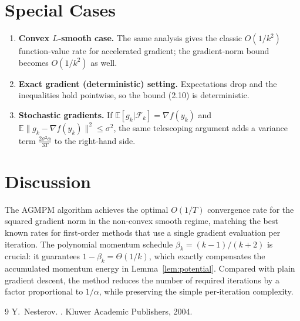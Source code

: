 \documentclass{article}
\newcommand{\E}{\mathbb{E}}
\begin{document}
\section*{Special Cases}
\begin{enumerate}[nosep]
    \item \textbf{Convex $L$‑smooth case.}
          The same analysis gives the classic $O(1/k^2)$ function‑value rate
          for accelerated gradient; the gradient‑norm bound becomes
          $O(1/k^2)$ as well.
    \item \textbf{Exact gradient (deterministic) setting.}
          Expectations drop and the inequalities hold pointwise, so the
          bound (2.10) is deterministic.
    \item \textbf{Stochastic gradients.}
          If $\E[g_k|\mathcal{F}_k]=\nabla f(y_k)$ and
          $\E\|g_k-\nabla f(y_k)\|^2\le\sigma^2$, the same telescoping
          argument adds a variance term $\frac{2\sigma^2\alpha}{3T}$ to the
          right‑hand side.
\end{enumerate}

\section*{Discussion}
The AGMPM algorithm achieves the optimal $O(1/T)$ convergence rate
for the squared gradient norm in the non‑convex smooth regime, matching
the best known rates for first‑order methods that use a single gradient
evaluation per iteration.  The polynomial momentum schedule
$\beta_k=(k-1)/(k+2)$ is crucial: it guarantees $1-\beta_k = \Theta(1/k)$,
which exactly compensates the accumulated momentum energy in Lemma~\ref{lem:potential}.  Compared with plain gradient descent,
the method reduces the number of required iterations by a factor
proportional to $1/\alpha$, while preserving the simple per‑iteration
complexity.


\begin{thebibliography}{9}
Y.~Nesterov.
.
\newblock Kluwer Academic Publishers, 2004.
\end{thebibliography}
\end{document}
